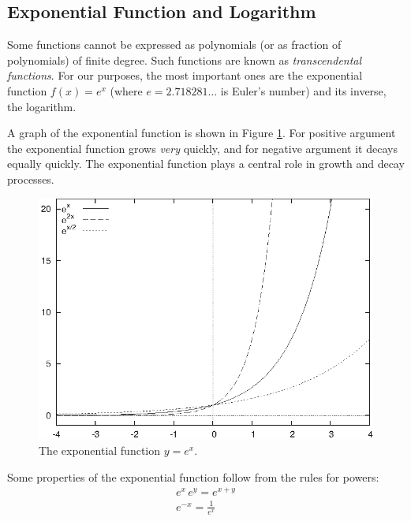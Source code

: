 \subsection{Exponential Function and Logarithm}


Some functions cannot be expressed as polynomials (or as fraction of
polynomials) of finite degree. Such functions are known as
\emph{transcendental functions}.  For our purposes, the most important
ones are the exponential function $f(x) = e^x$ (where $e =
2.718281\dots$ is Euler's number) and its inverse, the logarithm.

A graph of the exponential function is shown in Figure
\ref{fig:exponential}. For positive argument the exponential function
grows \emph{very} quickly, and for negative argument it decays equally
quickly. The exponential function plays a central role in growth and
decay processes.

\begin{figure}
  \centerline{\includegraphics{img/exponential}}
  \caption{The exponential function $y = e^x$.}
  \label{fig:exponential}\vspace*{-9pt}
\end{figure}
  
Some properties of the exponential function follow from the rules for
powers:
%
\begin{gather*}
  e^x \, e^y = e^{x+y} \\
  e^{-x} = \frac{1}{e^x}
\end{gather*}
%

